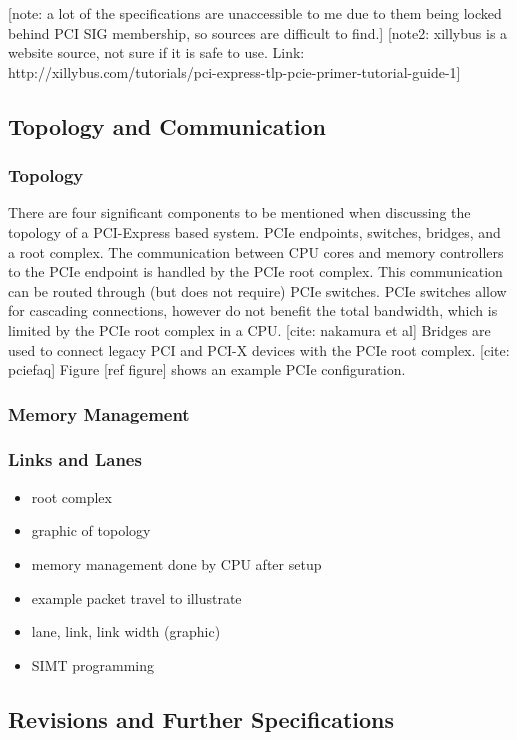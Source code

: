 [note: a lot of the specifications are unaccessible to me due to them being locked behind PCI SIG membership, so sources are difficult to find.]
[note2: xillybus is a website source, not sure if it is safe to use. Link: http://xillybus.com/tutorials/pci-express-tlp-pcie-primer-tutorial-guide-1]

\subsection{Topology and Communication}

\subsubsection{Topology}
There are four significant components to be mentioned when discussing the topology of a PCI-Express based system. PCIe endpoints, switches, bridges, and a root complex. 
The communication between CPU cores and memory controllers to the PCIe endpoint is handled by the PCIe root complex. This communication can be routed through (but does not require) PCIe switches. PCIe switches allow for cascading connections, however do not benefit the total bandwidth, which is limited by the PCIe root complex in a CPU. [cite: nakamura et al] 
Bridges are used to connect legacy PCI and PCI-X devices with the PCIe root complex. [cite: pciefaq]
Figure [ref figure] shows an example PCIe configuration.

\subsubsection{Memory Management}

\subsubsection{Links and Lanes}

\begin{itemize}
\item root complex
\item graphic of topology
\item memory management done by CPU after setup
\item example packet travel to illustrate
\item lane, link, link width (graphic)
\item SIMT programming
\end{itemize}

\subsection{Revisions and Further Specifications}

